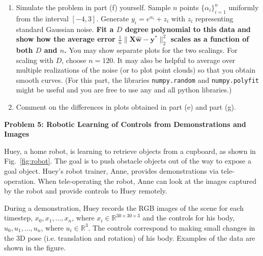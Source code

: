 \documentclass{article}\usepackage[utf8]{inputenc}\usepackage[margin=0.4cm,top=0.4cm,bottom=0.4cm]{geometry}\usepackage[usenames,dvipsnames,svgnames,table]{xcolor}
\begin{document}
\begin{enumerate}
\EndSolution
\item Simulate the problem in part (f) yourself. Sample $n$ points $\{\alpha_i\}_{i=1}^n$ uniformly from the interval $[-4, 3]$. Generate $y_i = e^{\alpha_i} + z_i$ with $z_i$ representing standard Gaussian noise. {\bf Fit a $D$ degree polynomial to this data and show how the average error $\frac{1}{n} \| \mathbf{X} \hat{\mathbf{w}} - \mathbf{y}^* \|_2^2$ scales as a function of both $D$ and $n$.} You may show separate plots for the two scalings. For scaling with $D$, choose $n = 120$. It may also be helpful to average over multiple realizations of the noise (or to plot point clouds) so that you obtain smooth curves. (For this part, the libraries \texttt{numpy.random} and \texttt{numpy.polyfit} might be useful and you are free to use any and all python libraries.)
\BeginSolution

\EndSolution
\item Comment on the differences in plots obtained in part (e) and part (g).
\BeginSolution

\EndSolution
\end{enumerate}
\clearpage

\vspace{-2mm}\noindent\begin{mybox}{\begin{center}\textbf{\color{black}Problem 5: Robotic Learning of Controls from Demonstrations and Images}\end{center}}\end{mybox}\vspace{-2mm}
\vspace{10pt}
\noindent Huey, a home robot, is learning to retrieve objects from a cupboard, as shown in Fig.~\ref{fig:robot}. The goal is to push obstacle objects out of the way to expose a goal object.  Huey's robot trainer, Anne, provides demonstrations via tele-operation. When tele-operating the robot, Anne can look at the images captured by the robot and provide controls to Huey remotely.
\vspace{4pt}

\noindent During a demonstration, Huey records the RGB images of the scene for each timestep, $x_0,x_1,...,x_{n}$, where $x_i \in \mathbb{R}^{30\times 30\times 3}$ and the controls for his body, $u_0,u_1,\ldots,u_{n}$, where $u_i \in \mathbb{R}^3$. The controls correspond to making small changes in the 3D pose (i.e. translation and rotation) of his body. Examples of the data are shown in the figure. 
\vspace{4pt}
\end{document}
